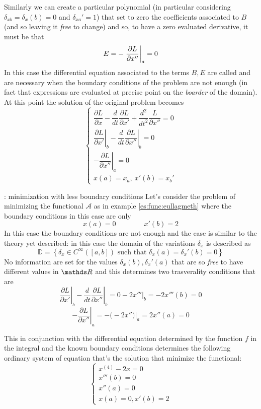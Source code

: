 	Similarly we can create a particular polynomial (in particular considering $ \delta_{xb} = \delta_x(b) = 0$ and $\delta_{xa}' = 1$) that set to zero the coefficients associated to $B$ (and so leaving it \textit{free} to change) and so, to have a zero evaluated derivative, it must be that
	\[ E = - \left. \frac{\partial L }{\partial x''} \right|_a = 0 \] 
	In this case the differential equation associated to the terms $B,E$ are called  and are necessary when the boundary conditions of the problem are not enough (in fact that expressions are evaluated at precise point on the \textit{boarder} of the domain). At this point the solution of the original problem becomes
	\[ \begin{cases}
		\dfrac{\partial L }{\partial x} - \dfrac{d}{dt} \dfrac{\partial L }{\partial x'} + \dfrac{d^2}{dt^2} \dfrac{L }{\partial x''} = 0 \\
		\left.\dfrac{\partial L }{\partial x'} \right|_b - \left. \dfrac{d}{dt} \dfrac{\partial L }{\partial x''} \right|_b = 0\\
		-\left. \dfrac{\partial L }{\partial x''} \right|_a = 0 \\
		x(a) = x_a, \ x'(b) = x_b'
	\end{cases} \]
	
	\begin{example}{: minimization with less boundary conditions}
		Let's consider the problem of minimizing the functional $\mathcal A$ as in example \ref{es:func:eullagmeth} where the boundary conditions in this case are only
		\[ x(a) = 0 \qquad \qquad x'(b) = 2  \]
		In this case the boundary conditions are not enough and the case is similar to the theory yet described: in this case the domain of the variations $\delta_x$ is described as
		\[ \mathds D = \left\{ \delta_x\in C^\infty([a,b]) \textrm{ such that } \delta_x(a) =\delta_x'(b) = 0 \right\} \]
		No information are set for the values $\delta_x(b), \delta_x'(a)$ that are so \textit{free} to have different values in $\R$ and this determines two trasverality conditions that are
		\[ \left.\dfrac{\partial L }{\partial x'} \right|_b - \left. \dfrac{d}{dt} \dfrac{\partial L }{\partial x''} \right|_b = 0-2x'''\Big|_b = -2x'''(b) = 0 \]\[ -\left. \dfrac{\partial L }{\partial x''} \right|_a = - \big(-2x''\big)\Big|_a = 2x''(a) = 0   \]
		
		This in conjunction with the differential equation determined by the function $f$ in the integral and the known boundary conditions determines the following ordinary system of equation that's the solution that minimize the functional:
		\[ \begin{cases}
			x^{(4)} - 2x = 0 \\
			x'''(b) = 0 \\ x''(a) = 0 \\
			x(a) = 0, x'(b) = 2
		\end{cases} \]		
	\end{example}
	
